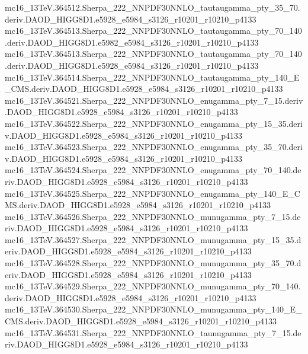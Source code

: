 \begin{scriptsize}
mc16\_13TeV.364512.Sherpa\_222\_NNPDF30NNLO\_tautaugamma\_pty\_35\_70.deriv.DAOD\_HIGG8D1.e5928\_e5984\_s3126\_r10201\_r10210\_p4133 \\
mc16\_13TeV.364513.Sherpa\_222\_NNPDF30NNLO\_tautaugamma\_pty\_70\_140.deriv.DAOD\_HIGG8D1.e5982\_e5984\_s3126\_r10201\_r10210\_p4133 \\
mc16\_13TeV.364513.Sherpa\_222\_NNPDF30NNLO\_tautaugamma\_pty\_70\_140.deriv.DAOD\_HIGG8D1.e5928\_e5984\_s3126\_r10201\_r10210\_p4133 \\
mc16\_13TeV.364514.Sherpa\_222\_NNPDF30NNLO\_tautaugamma\_pty\_140\_E\_CMS.deriv.DAOD\_HIGG8D1.e5928\_e5984\_s3126\_r10201\_r10210\_p4133 \\
mc16\_13TeV.364521.Sherpa\_222\_NNPDF30NNLO\_enugamma\_pty\_7\_15.deriv.DAOD\_HIGG8D1.e5928\_e5984\_s3126\_r10201\_r10210\_p4133 \\
mc16\_13TeV.364522.Sherpa\_222\_NNPDF30NNLO\_enugamma\_pty\_15\_35.deriv.DAOD\_HIGG8D1.e5928\_e5984\_s3126\_r10201\_r10210\_p4133 \\
mc16\_13TeV.364523.Sherpa\_222\_NNPDF30NNLO\_enugamma\_pty\_35\_70.deriv.DAOD\_HIGG8D1.e5928\_e5984\_s3126\_r10201\_r10210\_p4133 \\
mc16\_13TeV.364524.Sherpa\_222\_NNPDF30NNLO\_enugamma\_pty\_70\_140.deriv.DAOD\_HIGG8D1.e5928\_e5984\_s3126\_r10201\_r10210\_p4133 \\
mc16\_13TeV.364525.Sherpa\_222\_NNPDF30NNLO\_enugamma\_pty\_140\_E\_CMS.deriv.DAOD\_HIGG8D1.e5928\_e5984\_s3126\_r10201\_r10210\_p4133 \\
mc16\_13TeV.364526.Sherpa\_222\_NNPDF30NNLO\_munugamma\_pty\_7\_15.deriv.DAOD\_HIGG8D1.e5928\_e5984\_s3126\_r10201\_r10210\_p4133 \\
mc16\_13TeV.364527.Sherpa\_222\_NNPDF30NNLO\_munugamma\_pty\_15\_35.deriv.DAOD\_HIGG8D1.e5928\_e5984\_s3126\_r10201\_r10210\_p4133 \\
mc16\_13TeV.364528.Sherpa\_222\_NNPDF30NNLO\_munugamma\_pty\_35\_70.deriv.DAOD\_HIGG8D1.e5928\_e5984\_s3126\_r10201\_r10210\_p4133 \\
mc16\_13TeV.364529.Sherpa\_222\_NNPDF30NNLO\_munugamma\_pty\_70\_140.deriv.DAOD\_HIGG8D1.e5928\_e5984\_s3126\_r10201\_r10210\_p4133 \\
mc16\_13TeV.364530.Sherpa\_222\_NNPDF30NNLO\_munugamma\_pty\_140\_E\_CMS.deriv.DAOD\_HIGG8D1.e5928\_e5984\_s3126\_r10201\_r10210\_p4133 \\
mc16\_13TeV.364531.Sherpa\_222\_NNPDF30NNLO\_taunugamma\_pty\_7\_15.deriv.DAOD\_HIGG8D1.e5928\_e5984\_s3126\_r10201\_r10210\_p4133 \\

\end{scriptsize}
